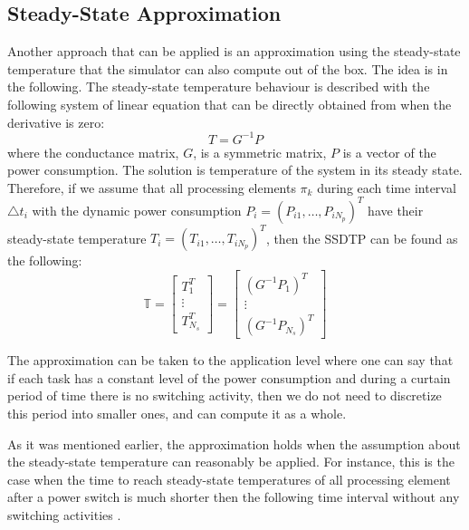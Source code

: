 \subsection{Steady-State Approximation}
Another approach that can be applied is an approximation using the steady-state temperature \cite{huang2009} that the simulator can also compute out of the box. The idea is in the following. The steady-state temperature behaviour is described with the following system of linear equation that can be directly obtained from  when the derivative is zero:
\[
  T = G^{-1} P
\]
where the conductance matrix, $G$, is a symmetric matrix, $P$ is a vector of the power consumption. The solution is temperature of the system in its steady state. Therefore, if we assume that all processing elements $\pi_k$ during each time interval $\triangle t_i$ with the dynamic power consumption $P_i = ( P_{i1}, \dots, P_{i N_p } )^T$ have their steady-state temperature $T_i = ( T_{i1}, \dots, T_{i N_p} )^T$, then the SSDTP can be found as the following:
\begin{equation*}
  \mathbb{T} = \left[
    \begin{array}{c}
      T_1^T \\
      \vdots \\
      T_{N_s}^T
    \end{array}
  \right] = \left[
    \begin{array}{c}
      (G^{-1} P_1)^T \\
      \vdots \\
      (G^{-1} P_{N_s})^T
    \end{array}
  \right]
\end{equation*}

The approximation can be taken to the application level where one can say that if each task has a constant level of the power consumption and during a curtain period of time there is no switching activity, then we do not need to discretize this period into smaller ones, and can compute it as a whole.

As it was mentioned earlier, the approximation holds when the assumption about the steady-state temperature can reasonably be applied. For instance, this is the case when the time to reach steady-state temperatures of all processing element after a power switch is much shorter then the following time interval without any switching activities \cite{huang2009}.
